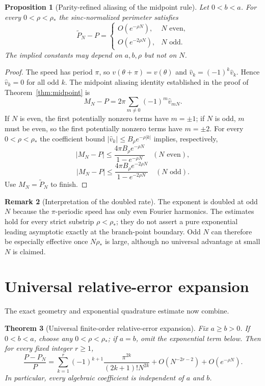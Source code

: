 \documentclass[11pt]{article}
\newtheorem{theorem}{Theorem}[section]
\newtheorem{proposition}[theorem]{Proposition}
\theoremstyle{definition}
\newtheorem{remark}[theorem]{Remark}
\numberwithin{equation}{section}
\begin{document}
\begin{proposition}[Parity-refined aliasing of the midpoint rule]
\label{prop:parity}
Let $0<b<a$. For every $0<\rho<\rho_*$ the sinc-normalized
perimeter satisfies
\begin{equation}\label{eq:parity-bound}
\widetilde P_N-P=\begin{cases}
O(e^{-\rho N}),&N\text{ even},\\
O(e^{-2\rho N}),&N\text{ odd}.
\end{cases}
\end{equation}
The implied constants may depend on $a,b,\rho$ but not on $N$.
\end{proposition}
\begin{proof}
The speed has period $\pi$, so $v(\theta+\pi)=v(\theta)$ and
$\widehat v_k=(-1)^k\widehat v_k$. Hence $\widehat v_k=0$
for all odd $k$. The midpoint aliasing identity established in the
proof of Theorem~\ref{thm:midpoint} is
\[
M_N-P=2\pi\sum_{m\ne0}(-1)^m\widehat v_{mN}.
\]
If $N$ is even, the first potentially nonzero terms have $m=\pm1$;
if $N$ is odd, $m$ must be even, so the first potentially nonzero
terms have $m=\pm2$. For every $0<\rho<\rho_*$ the coefficient
bound $|\widehat v_k|\le B_\rho e^{-\rho|k|}$ implies, respectively,
\[
|M_N-P|\le\frac{4\pi B_\rho e^{-\rho N}}
{1-e^{-\rho N}}\quad(N\text{ even}),
\]
\[
|M_N-P|\le\frac{4\pi B_\rho e^{-2\rho N}}
{1-e^{-2\rho N}}\quad(N\text{ odd}).
\]
Use $M_N=\widetilde P_N$ to finish.
\end{proof}
\begin{remark}[Interpretation of the doubled rate]
The exponent is doubled at odd $N$ because the $\pi$-periodic speed
has only even Fourier harmonics. The estimates hold for every strict
substrip $\rho<\rho_*$; they do not assert a pure exponential
leading asymptotic exactly at the branch-point boundary. Odd $N$
can therefore be especially effective once $N\rho_*$ is large,
although no universal advantage at small $N$ is claimed.
\end{remark}

\section{Universal relative-error expansion}

The exact geometry and exponential quadrature estimate now combine.

\begin{theorem}[Universal finite-order relative-error expansion]
\label{thm:universal}
Fix \(a\ge b>0\).  If \(0<b<a\), choose any
\(0<\rho<\rho_*\); if \(a=b\), omit the exponential term below.
Then for every fixed integer \(r\ge1\),
\begin{equation}
\label{eq:universal}
\boxed{
\frac{P-P_N}{P}
=
\sum_{k=1}^{r}
(-1)^{k+1}
\frac{\pi^{2k}}{(2k+1)!N^{2k}}
+
O(N^{-2r-2})
+
O(e^{-\rho N}).
}
\end{equation}
In particular, every algebraic coefficient is independent of \(a\)
and \(b\).
\end{theorem}
\end{document}
